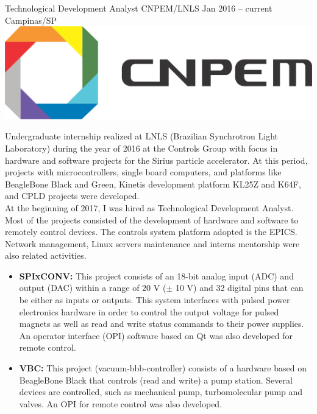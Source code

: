 \documentclass[
	a4paper,
]{fortysecondscv}
\begin{document}
\graphicspath{{../figures/work/}}
    \cvevent
        {Technological Development Analyst}
        {CNPEM/LNLS}
        {Jan 2016 -- current}
        {Campinas/SP}
        {\hspace{2mm}\includegraphics[height=0.05\textwidth]{CNPEM}}
        {Undergraduate internship realized at LNLS (Brazilian Synchrotron Light Laboratory) during the year of 2016 at the Controls Group with focus in hardware and software projects for the Sirius particle accelerator. At this period, projects with microcontrollers, single board computers, and platforms like BeagleBone Black and Green, Kinetis development platform KL25Z and K64F, and CPLD projects were developed.\\
        At the beginning of 2017, I was hired as Technological Development Analyst. Most of the projects consisted of the development of hardware and software to remotely control devices. The controls system platform adopted is the EPICS. Network management, Linux servers maintenance and interns mentorship were also related activities.
        \begin{itemize}
            \item {} \hspace{0.5mm} \textbf{SPIxCONV:} This project consists of an 18-bit analog input (ADC) and output (DAC) within a range of 20 V ($\pm$ 10 V) and 32 digital pins that can be either as inputs or outputs. This system interfaces with pulsed power electronics hardware in order to control the output voltage for pulsed magnets as well as read and write status commands to their power supplies. An operator interface (OPI) software based on Qt was also developed for remote control.
            \item {} \hspace{0.5mm} \textbf{VBC:} This project (vacuum-bbb-controller) consists of a hardware based on BeagleBone Black that controls (read and write) a pump station. Several devices are controlled, such as mechanical pump, turbomolecular pump and valves. An OPI for remote control was also developed.

\end{itemize}}
\end{document}
